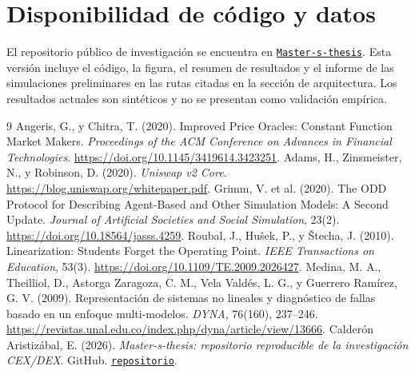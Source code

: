 \documentclass[11pt,a4paper]{article}
\begin{document}
\section*{Disponibilidad de código y datos}
El repositorio público de investigación se encuentra en \href{https://github.com/edwardcalderon/Master-s-thesis}{\texttt{Master-s-thesis}}. Esta versión incluye el código, la figura, el resumen de resultados y el informe de las simulaciones preliminares en las rutas citadas en la sección de arquitectura. Los resultados actuales son sintéticos y no se presentan como validación empírica.

\renewcommand{\refname}{Referencias}
\begin{thebibliography}{9}
 Angeris, G., y Chitra, T. (2020). Improved Price Oracles: Constant Function Market Makers. \emph{Proceedings of the ACM Conference on Advances in Financial Technologies}. \url{https://doi.org/10.1145/3419614.3423251}.
 Adams, H., Zinsmeister, N., y Robinson, D. (2020). \emph{Uniswap v2 Core}. \url{https://blog.uniswap.org/whitepaper.pdf}.
 Grimm, V. et al. (2020). The ODD Protocol for Describing Agent-Based and Other Simulation Models: A Second Update. \emph{Journal of Artificial Societies and Social Simulation}, 23(2). \url{https://doi.org/10.18564/jasss.4259}.
 Roubal, J., Hu\v{s}ek, P., y \v{S}techa, J. (2010). Linearization: Students Forget the Operating Point. \emph{IEEE Transactions on Education}, 53(3). \url{https://doi.org/10.1109/TE.2009.2026427}.
 Medina, M. A., Theilliol, D., Astorga Zaragoza, C. M., Vela Valdés, L. G., y Guerrero Ramírez, G. V. (2009). Representación de sistemas no lineales y diagnóstico de fallas basado en un enfoque multi-modelos. \emph{DYNA}, 76(160), 237--246. \url{https://revistas.unal.edu.co/index.php/dyna/article/view/13666}.
 Calderón Aristizábal, E. (2026). \emph{Master-s-thesis: repositorio reproducible de la investigación CEX/DEX}. GitHub. \href{https://github.com/edwardcalderon/Master-s-thesis}{\texttt{repositorio}}.
\end{thebibliography}
\end{document}
